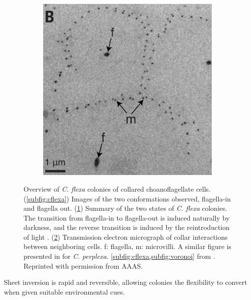 \begin{figure}[htbp]
\begin{subfigure}[b]{0.29\textwidth}
		\caption{}
		\label{subfig:table}
	\end{subfigure}
	\begin{subfigure}[b]{0.4\textwidth}
		\centering
		\includegraphics[width=\textwidth]{voronoi.png}
		\caption{}
		\label{subfig:voronoi}
	\end{subfigure}
	\caption[Overview of \textit{C. flexa} colonies of collared choanoflagellate cells]{Overview of \textit{C. flexa} colonies of collared choanoflagellate cells. (\ref{subfig:cflexa}) Images of the two conformations observed, flagella-in and flagella out. (\ref{subfig:table}) Summary of the two states of \textit{C. flexa} colonies. The transition from flagella-in to flagella-out is induced naturally by darkness, and the reverse transition is induced by the reintroduction of light \citep{brunet2019}. (\ref{subfig:voronoi}) Transmission electron micrograph of collar interactions between neighboring cells. f: flagella, m: microvilli. A similar figure is presented in \citet{leadbeater1983} for \textit{C. perplexa}. \cref{subfig:cflexa,subfig:voronoi} from \citet{brunet2019}. Reprinted with permission from AAAS.}
	\label{fig:cflexa}
\end{figure} 

Sheet inversion is rapid and reversible, allowing colonies the flexibility to convert when given suitable environmental cues.


